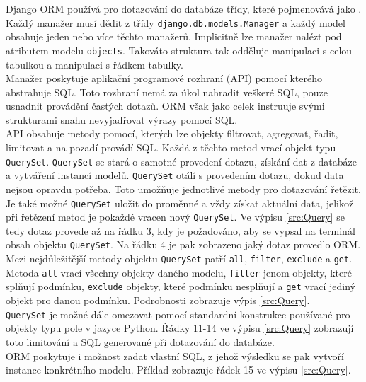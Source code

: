 \documentclass[ing,male,java,dept456]{diploma}						%
\begin{document}
Django ORM používá pro dotazování do databáze třídy, které pojmenovává jako . Každý manažer musí dědit z třídy \lstinline[style=custompython]|django.db.models.Manager| a každý model obsahuje jeden nebo více těchto manažerů. Implicitně lze manažer nalézt pod atributem modelu \lstinline[style=inlinepython]|objects|. Takováto struktura tak odděluje manipulaci s celou tabulkou a manipulaci s řádkem tabulky. \\
Manažer poskytuje aplikační programové rozhraní (API) pomocí kterého abstrahuje SQL. Toto rozhraní nemá za úkol nahradit veškeré SQL, pouze usnadnit provádění častých dotazů. ORM však jako celek instruuje svými strukturami snahu nevyjadřovat výrazy pomocí SQL. \\
API obsahuje metody pomocí, kterých lze objekty filtrovat, agregovat, řadit, limitovat a na pozadí provádí SQL. Každá z těchto metod vrací objekt typu \lstinline[style=inlinepython]|QuerySet|. \lstinline[style=inlinepython]|QuerySet| se stará o samotné provedení dotazu, získání dat z databáze a vytváření instancí modelů. \lstinline[style=inlinepython]|QuerySet| otálí s provedením dotazu, dokud data nejsou opravdu potřeba. Toto umožňuje jednotlivé metody pro dotazování řetězit. Je také možné \lstinline[style=inlinepython]|QuerySet| uložit do proměnné a vždy získat aktuální data, jelikož při řetězení metod je pokaždé vracen nový \lstinline[style=inlinepython]|QuerySet|. Ve výpisu \ref{src:Query} se tedy dotaz provede až na řádku 3, kdy je požadováno, aby se vypsal na terminál obsah objektu \lstinline[style=inlinepython]|QuerySet|. Na řádku 4 je pak zobrazeno jaký dotaz provedlo ORM. \\
Mezi nejdůležitější metody objektu \lstinline[style=inlinepython]|QuerySet| patří \lstinline[style=inlinepython]|all|, \lstinline[style=inlinepython]|filter|, \lstinline[style=inlinepython]|exclude| a \lstinline[style=inlinepython]|get|. Metoda \lstinline[style=inlinepython]|all| vrací všechny objekty daného modelu, \lstinline[style=inlinepython]|filter| jenom objekty, které splňují podmínku, \lstinline[style=inlinepython]|exclude| objekty, které podmínku nesplňují a \lstinline[style=inlinepython]|get| vrací jediný objekt pro danou podmínku. Podrobnosti zobrazuje výpis \ref{src:Query}. \\
\lstinline[style=inlinepython]|QuerySet| je možné dále omezovat pomocí standardní konstrukce používané pro objekty typu pole v jazyce Python. Řádky 11-14 ve výpisu \ref{src:Query} zobrazují toto limitování a SQL generované při dotazování do databáze. \\
ORM poskytuje i možnost zadat vlastní SQL, z jehož výsledku se pak vytvoří instance konkrétního modelu. Příklad zobrazuje řádek 15 ve výpisu \ref{src:Query}.
\end{document}

